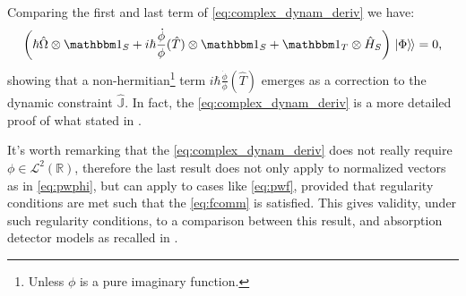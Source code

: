 Comparing the first and last term of \eqref{eq:complex_dynam_deriv} we have:
\begin{equation}
  \qty(
    \hbar\hat{\Omega} \ox \idop_S +
    i \hbar \frac{\dot{\phi}}{\phi} (\hat{T}) \ox \idop_S +
    \idop_T \ox \hat{H}_S
  ) \dket{\Phi} = 0
  \text{,}
\end{equation}
showing that a non-hermitian\footnote{
  Unless $\phi$  is a pure imaginary function.
}
term
$i \hbar \frac{\dot{\phi}}{\phi} (\hat{T})$
emerges as a correction to the dynamic constraint $\hat{\mathbb{J}}$.
In fact, the \eqref{eq:complex_dynam_deriv}
is a more detailed proof of what stated in
\cite[eq. 27]{Lloyd:Time}.

It's worth remarking that the \eqref{eq:complex_dynam_deriv} does not really require
$\phi \in \mathcal{L}^2(\mathbb{R})$, therefore the last result does not only apply
to normalized vectors as in \eqref{eq:pwphi}, but can apply to cases like
\eqref{eq:pwf}, provided that regularity conditions are met such that
the \eqref{eq:fcomm} is satisfied.
This gives validity,
under such regularity conditions,
to a comparison
between 
this  result,
and absorption detector models
as recalled in \cite{RuschhauptAbsorption}.